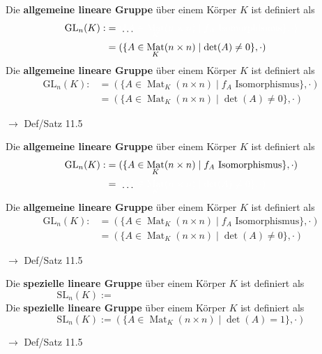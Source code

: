 \documentclass[11pt]{article}
\renewcommand{\cite}[1]{\par\bigskip\hfill{\color{gray}\tiny\(\to\) #1}}
\DeclareMathOperator{\Mat}{Mat}
\newcommand{\hide}[1]{\parbox{0cm}{\raisebox{-7pt}[0cm]{\dots}}\color{white}#1\color{black}}
\let\olddots\dots
\renewcommand{\dots}{\,\olddots\,}
\newenvironment{field}{}{\newpage}
\newif\ifnote
\newenvironment{note}{\notetrue}{\notefalse}
\newcommand{\localtag}{}
\newcommand{\globaltag}{}
\newcommand{\uuid}{}
\newcommand{\tags}[1]{
    \ifnote
        \renewcommand{\localtag}{#1}
    \else
        \renewcommand{\globaltag}{#1}
    \fi
    }
\newcommand{\xplain}[1]{\renewcommand{\uuid}{#1}}
\begin{document}
\begin{note}
    \tags{Def Satz}
    \xplain{91122bd6-c30d-11ec-9d64-0242ac120002}
    \begin{field} %
        Die \textbf{allgemeine lineare Gruppe} über einem Körper \(K\) ist definiert als
        \begin{align*}
            \text{GL}_n(K) :&= \hide{(\{A\in\Mat_K(n \times n) \mid f_A \text{ Isomorphismus} \}, \cdot)}\\
            &= (\{A\in\Mat_K(n \times n) \mid \det(A) \neq 0 \}, \cdot)
        \end{align*}
    \end{field}
    \begin{field}
        Die \textbf{allgemeine lineare Gruppe} über einem Körper \(K\) ist definiert als
        \begin{align*}
            \text{GL}_n(K) :&= (\{A\in\Mat_K(n \times n) \mid f_A \text{ Isomorphismus} \}, \cdot)\\
            &= (\{A\in\Mat_K(n \times n) \mid \det(A) \neq 0 \}, \cdot)
        \end{align*}
        \cite{Def/Satz 11.5}
    \end{field}

    \begin{field} %
        Die \textbf{allgemeine lineare Gruppe} über einem Körper \(K\) ist definiert als
        \begin{align*}
            \text{GL}_n(K) :&= (\{A\in\Mat_K(n \times n) \mid  f_A \text{ Isomorphismus} \}, \cdot)\\
            &= \hide{(\{A\in\Mat_K(n \times n) \mid \det(A) \neq 0 \}, \cdot)}
        \end{align*}
    \end{field}
    \begin{field}
        Die \textbf{allgemeine lineare Gruppe} über einem Körper \(K\) ist definiert als
        \begin{align*}
            \text{GL}_n(K) :&= (\{A\in\Mat_K(n \times n) \mid  f_A \text{ Isomorphismus} \}, \cdot)\\
            &= (\{A\in\Mat_K(n \times n) \mid  \det(A) \neq 0 \}, \cdot)
        \end{align*}
        \cite{Def/Satz 11.5}
    \end{field}

    \begin{field} %
        Die \textbf{spezielle lineare Gruppe} über einem Körper \(K\) ist definiert als
        \[\text{SL}_n(K) := \phantom{(\{ A \in\Mat_K(n\times n)\mid \det(A) = 1\}, \cdot ) }\]
    \end{field}
    \begin{field}
        Die \textbf{spezielle lineare Gruppe} über einem Körper \(K\) ist definiert als
        \[\text{SL}_n(K) := (\{ A \in\Mat_K(n\times n)\mid \det(A) = 1\}, \cdot )\]
        \cite{Def/Satz 11.5}
    \end{field}
\end{note}
\end{document}
